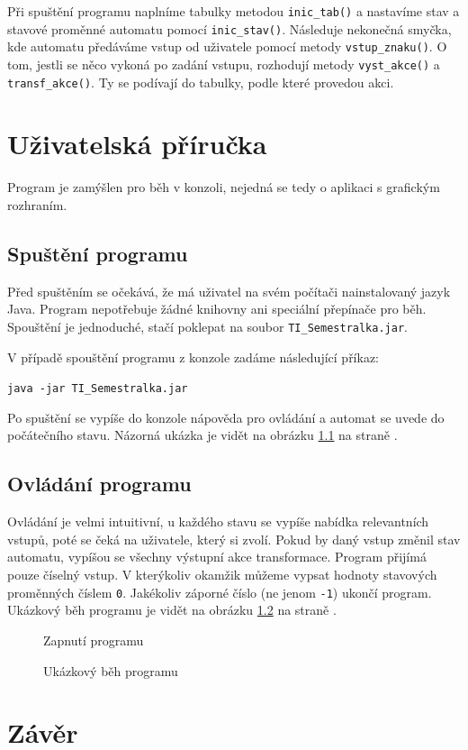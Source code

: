 \documentclass[12pt]{report}
\newcommand\indentt[1]{						
	\setlength\parindent{5mm}
	#1
	\setlength\parindent{0mm}
}												%
\begin{document}
	Při spuštění programu naplníme tabulky metodou \texttt{inic\_tab()} a nastavíme stav a stavové proměnné automatu pomocí \texttt{inic\_stav()}. Následuje nekonečná smyčka, kde automatu předáváme vstup od uživatele pomocí metody \texttt{vstup\_znaku()}. O tom, jestli se něco vykoná po zadání vstupu, rozhodují metody \texttt{vyst\_akce()} a \texttt{transf\_akce()}. Ty se podívají do tabulky, podle které provedou akci.
	
	\chapter{Uživatelská příručka}
	Program je zamýšlen pro běh v konzoli, nejedná se tedy o aplikaci s grafickým rozhraním.
	
	\section{Spuštění programu}
	Před spuštěním se očekává, že má uživatel na svém počítači nainstalovaný jazyk Java. Program nepotřebuje žádné knihovny ani speciální přepínače pro běh. Spouštění je jednoduché, stačí poklepat na soubor \texttt{TI\_Semestralka.jar}. 
	
	V případě spouštění programu z konzole zadáme následující příkaz:
	
	\indentt{
		\texttt{java -jar TI\_Semestralka.jar} \keys{\return}
	}
	
	Po spuštění se vypíše do konzole nápověda pro ovládání a automat se uvede do počátečního stavu. Názorná ukázka je vidět na obrázku \ref{fig:start} na straně \pageref{fig:start}. 
	
	\section{Ovládání programu}
	Ovládání je velmi intuitivní, u každého stavu se vypíše nabídka relevantních vstupů, poté se čeká na uživatele, který si zvolí. Pokud by daný vstup změnil stav automatu, vypíšou se všechny výstupní akce transformace. Program přijímá pouze číselný vstup. V kterýkoliv okamžik můžeme vypsat hodnoty stavových proměnných číslem \texttt{0}. Jakékoliv záporné číslo (ne jenom \texttt{-1}) ukončí program. Ukázkový běh programu je vidět na obrázku \ref{fig:beh} na straně \pageref{fig:beh}.

	\begin{figure}
		\centering
		\caption{Zapnutí programu}
		\label{fig:start}
	\end{figure}

	\begin{figure}
		\centering
		\caption{Ukázkový běh programu}
		\label{fig:beh}
	\end{figure}


	\chapter{Závěr}
	
\end{document}
